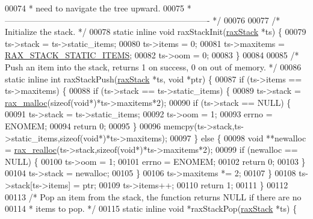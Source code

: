 \begin{DoxyCode}
{00074 \textcolor{comment}{ * need to navigate the tree upward.}
00075 \textcolor{comment}{ * ------------------------------------------------------------------------- */}
00076 
00077 \textcolor{comment}{/* Initialize the stack. */}
00078 \textcolor{keyword}{static} \textcolor{keyword}{inline} \textcolor{keywordtype}{void} raxStackInit(\hyperlink{structraxStack}{raxStack} *ts) \{
00079     ts->stack = ts->static\_items;
00080     ts->items = 0;
00081     ts->maxitems = \hyperlink{rax_8h_aff05c7893713f82d106c046f55ac1bf5}{RAX\_STACK\_STATIC\_ITEMS};
00082     ts->oom = 0;
00083 \}
00084 
00085 \textcolor{comment}{/* Push an item into the stack, returns 1 on success, 0 on out of memory. */}
00086 \textcolor{keyword}{static} \textcolor{keyword}{inline} \textcolor{keywordtype}{int} raxStackPush(\hyperlink{structraxStack}{raxStack} *ts, \textcolor{keywordtype}{void} *ptr) \{
00087     \textcolor{keywordflow}{if} (ts->items == ts->maxitems) \{
00088         \textcolor{keywordflow}{if} (ts->stack == ts->static\_items) \{
00089             ts->stack = \hyperlink{rax__malloc_8h_aba4b5d6a50f54903fe9c330308beb66a}{rax\_malloc}(\textcolor{keyword}{sizeof}(\textcolor{keywordtype}{void}*)*ts->maxitems*2);
00090             \textcolor{keywordflow}{if} (ts->stack == NULL) \{
00091                 ts->stack = ts->static\_items;
00092                 ts->oom = 1;
00093                 errno = ENOMEM;
00094                 \textcolor{keywordflow}{return} 0;
00095             \}
00096             memcpy(ts->stack,ts->static\_items,\textcolor{keyword}{sizeof}(\textcolor{keywordtype}{void}*)*ts->maxitems);
00097         \} \textcolor{keywordflow}{else} \{
00098             \textcolor{keywordtype}{void} **newalloc = \hyperlink{rax__malloc_8h_a4aa041a0e1eaa6d8476e889547280467}{rax\_realloc}(ts->stack,\textcolor{keyword}{sizeof}(\textcolor{keywordtype}{void}*)*ts->maxitems*2);
00099             \textcolor{keywordflow}{if} (newalloc == NULL) \{
00100                 ts->oom = 1;
00101                 errno = ENOMEM;
00102                 \textcolor{keywordflow}{return} 0;
00103             \}
00104             ts->stack = newalloc;
00105         \}
00106         ts->maxitems *= 2;
00107     \}
00108     ts->stack[ts->items] = ptr;
00109     ts->items++;
00110     \textcolor{keywordflow}{return} 1;
00111 \}
00112 
00113 \textcolor{comment}{/* Pop an item from the stack, the function returns NULL if there are no}
00114 \textcolor{comment}{ * items to pop. */}
00115 \textcolor{keyword}{static} \textcolor{keyword}{inline} \textcolor{keywordtype}{void} *raxStackPop(\hyperlink{structraxStack}{raxStack} *ts) \{
}
\end{DoxyCode}
